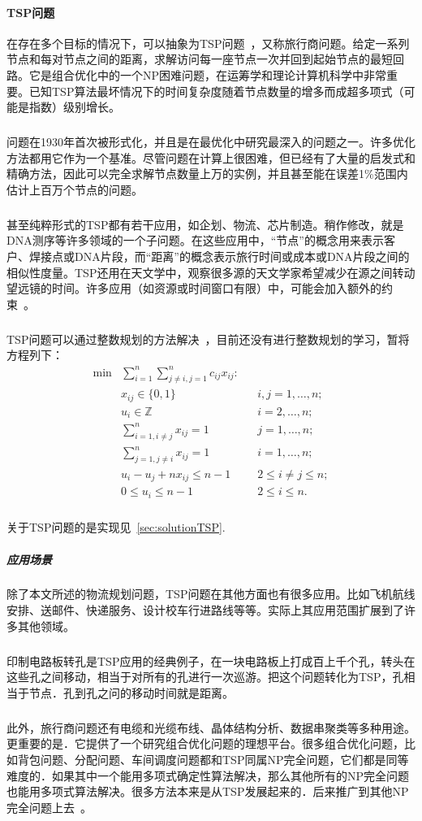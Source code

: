 \documentclass[UTF8,a4paper]{ctexart}
\begin{document}
\paragraph{TSP问题}在存在多个目标的情况下，可以抽象为TSP问题~\cite{tsptheory}，又称旅行商问题。给定一系列节点和每对节点之间的距离，求解访问每一座节点一次并回到起始节点的最短回路。它是组合优化中的一个NP困难问题，在运筹学和理论计算机科学中非常重要。已知TSP算法最坏情况下的时间复杂度随着节点数量的增多而成超多项式（可能是指数）级别增长。
\subparagraph{}问题在1930年首次被形式化，并且是在最优化中研究最深入的问题之一。许多优化方法都用它作为一个基准。尽管问题在计算上很困难，但已经有了大量的启发式和精确方法，因此可以完全求解节点数量上万的实例，并且甚至能在误差1\%范围内估计上百万个节点的问题。
\subparagraph{}甚至纯粹形式的TSP都有若干应用，如企划、物流、芯片制造。稍作修改，就是DNA测序等许多领域的一个子问题。在这些应用中，“节点”的概念用来表示客户、焊接点或DNA片段，而“距离”的概念表示旅行时间或成本或DNA片段之间的相似性度量。TSP还用在天文学中，观察很多源的天文学家希望减少在源之间转动望远镜的时间。许多应用（如资源或时间窗口有限）中，可能会加入额外的约束~\cite{worldtsp}。
\subparagraph{}TSP问题可以通过整数规划的方法解决~\cite{papadimi}，目前还没有进行整数规划的学习，暂将方程列下：
\begin{align*}
    \min & \sum _{i=1}^{n}\sum _{j\neq i,j=1}^{n}c_{ij}x_{ij}\colon &  &                      \\
         & x_{ij}\in \{0,1\}                                        &  & i,j=1,\ldots ,n;     \\
         & u_{i}\in  \mathbb{Z}                                     &  & i=2,\ldots ,n;       \\
         & \sum _{i=1,i\neq j}^{n}x_{ij}=1                          &  & j=1,\ldots ,n;       \\
         & \sum _{j=1,j\neq i}^{n}x_{ij}=1                          &  & i=1,\ldots ,n;       \\
         & u_{i}-u_{j}+nx_{ij}\leq n-1                              &  & 2\leq i\neq j\leq n; \\
         & 0\leq u_{i}\leq n-1                                      &  & 2\leq i\leq n.
\end{align*}
\subparagraph{}关于TSP问题的是实现见~\ref{sec:solutionTSP}.
\subparagraph{应用场景}除了本文所述的物流规划问题，TSP问题在其他方面也有很多应用。比如飞机航线安排、送邮件、快递服务、设计校车行进路线等等。实际上其应用范围扩展到了许多其他领域。
\subparagraph{}印制电路板转孔是TSP应用的经典例子，在一块电路板上打成百上千个孔，转头在这些孔之间移动，相当于对所有的孔进行一次巡游。把这个问题转化为TSP，孔相当于节点．孔到孔之问的移动时间就是距离。
\subparagraph{}此外，旅行商问题还有电缆和光缆布线、晶体结构分析、数据串聚类等多种用途。更重要的是．它提供了一个研究组合优化问题的理想平台。很多组合优化问题，比如背包问题、分配问题、车间调度问题都和TSP同属NP完全问题，它们都是同等难度的．如果其中一个能用多项式确定性算法解决，那么其他所有的NP完全问题也能用多项式算法解决。很多方法本来是从TSP发展起来的．后来推广到其他NP完全问题上去~\cite{tsp2006}。
\end{document}
